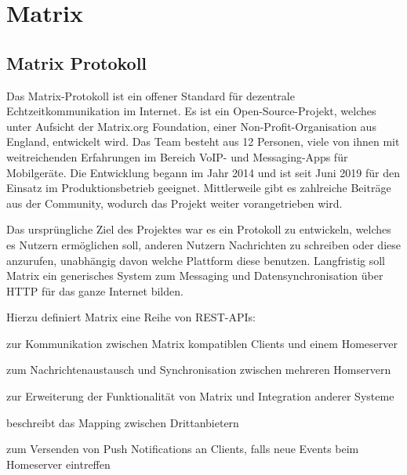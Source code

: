     \newpage
    \section{Matrix}\label{sec:matrix}

    \subsection{Matrix Protokoll}\label{subsec:matrix-protokoll}
    Das Matrix-Protokoll ist ein offener Standard für dezentrale Echtzeitkommunikation im Internet.
    Es ist ein Open-Source-Projekt, welches unter Aufsicht der Matrix.org Foundation, einer Non-Profit-Organisation aus England, entwickelt wird.
    Das Team besteht aus 12 Personen, viele von ihnen mit weitreichenden Erfahrungen im Bereich VoIP- und Messaging-Apps für Mobilgeräte.
    Die Entwicklung begann im Jahr 2014 und ist seit Juni 2019 für den Einsatz im Produktionsbetrieb geeignet.
    Mittlerweile gibt es zahlreiche Beiträge aus der Community, wodurch das Projekt weiter vorangetrieben wird.
    ~\cite{matrixfaq}

    Das ursprüngliche Ziel des Projektes war es ein Protokoll zu entwickeln, welches es Nutzern ermöglichen soll, anderen Nutzern Nachrichten zu schreiben oder diese anzurufen, unabhängig davon welche Plattform diese benutzen.
    Langfristig soll Matrix ein generisches System zum Messaging und Datensynchronisation über HTTP für das ganze Internet bilden.
    ~\cite{matrixfaq}

    Hierzu definiert Matrix eine Reihe von REST-APIs:
    \begin{description}[leftmargin=!,labelwidth=5.5cm]
        \item [Client-Server-API\footnotemark]  zur Kommunikation zwischen Matrix kompatiblen Clients und einem Homeserver
        \item [Server-Server-API\footnotemark]  zum Nachrichtenaustausch und Synchronisation zwischen mehreren Homservern
        \item [Application-Service-API\footnotemark]  zur Erweiterung der Funktionalität von Matrix und Integration anderer Systeme
        \item [Identity-Service-API\footnotemark]  beschreibt das Mapping zwischen Drittanbietern
        \item [Push-Gateway-API\footnotemark]  zum Versenden von Push Notifications an Clients, falls neue Events beim Homeserver eintreffen
    \end{description}



